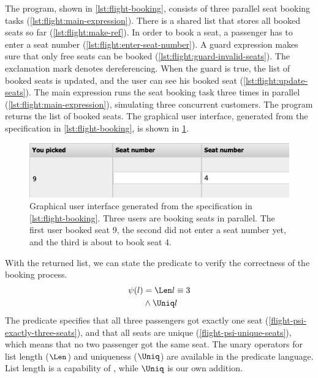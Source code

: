 The program, shown in \cref{lst:flight-booking}, consists of three parallel seat booking tasks (\cref{lst:flight:main-expression}).
There is a shared list that stores all booked seats so far (\cref{lst:flight:make-ref}).
In order to book a seat, a passenger has to enter a seat number (\cref{lst:flight:enter-seat-number}).
A guard expression makes sure that only free seats can be booked (\cref{lst:flight:guard-invalid-seats}).
The exclamation mark denotes dereferencing.
When the guard is true, the list of booked seats is updated, and the user can see his booked seat (\cref{lst:flight:update-seats}).
The main expression runs the seat booking task three times in parallel (\cref{lst:flight:main-expression}), simulating three concurrent customers.
The program returns the list of booked seats.
The graphical user interface, generated from the specification in \cref{lst:flight-booking}, is shown in \cref{fig:flight-booking}.

\begin{figure}[t]
  \includegraphics[width=\columnwidth]{figures/flight-booking.png}
  \caption{
    Graphical user interface generated from the specification in \cref{lst:flight-booking}.
    Three users are booking seats in parallel.
    The first user booked seat 9, the second did not enter a seat number yet, and the third is about to book seat 4.
  }
  \label{fig:flight-booking}
\end{figure}

With the returned list, we can state the predicate to verify the correctness of the booking process.
\setcounter{equation}{0}
\begin{align}
\psi(l)
   & =      \Len l \equiv 3 \label{flight-psi-exactly-three-seats}
\\ & \wedge \Uniq l \label{flight-psi-unique-seats}
\end{align}
The predicate specifies that all three passengers got exactly one seat (\ref{flight-psi-exactly-three-seats}), and that all seats are unique (\ref{flight-psi-unique-seats}), which means that no two passenger got the same seat.
The unary operators for list length ($\Len$) and uniqueness ($\Uniq$) are available in the predicate language.
List length is a capability of \SMTLIB, while $\Uniq$ is our own addition.
